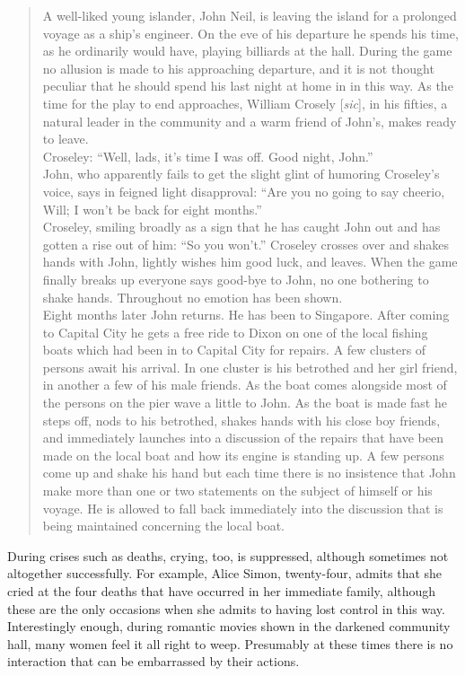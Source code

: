 \documentclass[twoside,symmetric,nobib,justified]{tufte-book}
\begin{document}
\begin{quote}
A well-liked young islander, John Neil, is leaving the island for a
prolonged voyage as a ship's engineer. On the eve of his departure he
spends his time, as he ordinarily would have, playing billiards at the
hall. During the game no allusion is made to his approaching departure,
and it is not thought peculiar that he should spend his last night at
home in in this way. As the time for the play to end approaches, William
Crosely {[}\emph{sic}{]}, in his fifties, a natural leader in the
community and a warm friend of John's, makes ready to leave. \\
Croseley: ``Well, lads, it's time I was off. Good night, John.'' \\
John, who apparently fails to get the slight glint of humoring
Croseley's voice, says in feigned light disapproval: ``Are you no going
to say cheerio, Will; I won't be back for eight months.'' \\
Croseley, smiling broadly as a sign that he has caught John out and has
gotten a rise out of him: ``So you won't.'' Croseley crosses over and
shakes hands with John, lightly wishes him good luck, and leaves. When
the game finally breaks up everyone says good-bye to John, no one
bothering to shake hands. Throughout no emotion has been shown. \\
Eight months later John returns. He has been to Singapore. After coming
to Capital City he gets a free ride to Dixon on one of the local fishing
boats which had been in to Capital City for repairs. A few clusters of
persons await his arrival. In one cluster is his betrothed and her girl
friend, in another a few of his male friends. As the boat comes
alongside most of the persons on the pier wave a little to John. As the
boat is made fast he steps off, nods to his betrothed, shakes hands with
his close boy friends, and immediately launches into a discussion of the
repairs that have been made on the local boat and how its engine is
standing up. A few persons come up and shake his hand but each time
there is no insistence that John make more than one or two statements on
the subject of himself or his voyage. He is allowed to fall back
immediately into the discussion that is being maintained concerning the
local boat.
\end{quote}

During crises such as deaths, crying, too, is suppressed, although
sometimes not altogether successfully. For example, Alice Simon,
twenty-four, admits that she cried at the four deaths that have occurred
in her immediate family, although these are the only occasions when she
admits to having lost control in this way. Interestingly enough, during
romantic movies shown in the darkened community hall, many women feel it
all right to weep. Presumably at these times there is no interaction
that can be embarrassed by their actions.
\end{document}
